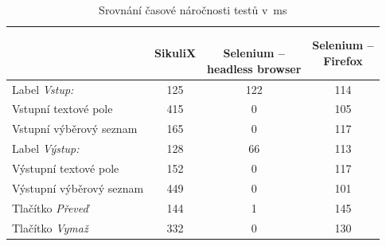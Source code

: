		\begin{table}
			\centering
			\caption{Srovnání časové náročnosti testů v~ms}
			\label{casovaNarocnost}
			\begin{tabular}{|l||c|c|c|}
			\hline
			&SikuliX&\shortstack{\\Selenium --\\headless browser}&\shortstack{Selenium --\\Firefox}\\\hline\hline
			Label \emph{Vstup:}&125&122&114\\\hline
			Vstupní textové pole&415&0&105\\\hline
			Vstupní výběrový seznam&165&0&117\\\hline
			Label \emph{Výstup:}&128&66&113\\\hline
			Výstupní textové pole&152&0&117\\\hline
			Výstupní výběrový seznam&449&0&101\\\hline
			Tlačítko \emph{Převeď}&144&1&145\\\hline
			Tlačítko \emph{Vymaž}&332&0&130\\\hline
			\end{tabular}
		\end{table}